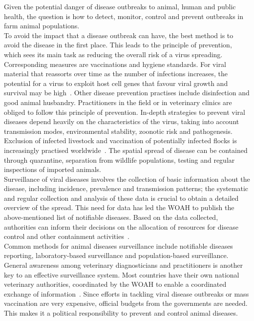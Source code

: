 Given the potential danger of disease outbreaks to animal, human and public health, the question is how to detect, monitor, control and prevent outbreaks in farm animal populations. \\
To avoid the impact that a disease outbreak can have, the best method is to avoid the disease in the first place. This leads to the principle of prevention, which sees its main task as reducing the overall risk of a virus spreading. Corresponding measures are vaccinations and hygiene standards. For viral material that reassorts over time as the number of infections increases, the potential for a virus to exploit host cell genes that favour viral growth and survival may be high~\cite{fenner2017maclachlan}. Other disease prevention practises include disinfection and good animal husbandry. Practitioners in the field or in veterinary clinics are obliged to follow this principle of prevention. In-depth strategies to prevent viral diseases depend heavily on the characteristics of the virus, taking into account transmission modes, environmental stability, zoonotic risk and pathogenesis. Exclusion of infected livestock and vaccination of potentially infected flocks is increasingly practised worldwide~\cite{fenner2017maclachlan}. The spatial spread of disease can be contained through quarantine, separation from wildlife populations, testing and regular inspections of imported animals. \\
Surveillance of viral diseases involves the collection of basic information about the disease, including incidence, prevalence and transmission patterns; the systematic and regular collection and analysis of these data is crucial to obtain a detailed overview of the spread. This need for data has led the \ac{WOAH} to publish the above-mentioned list of notifiable diseases. Based on the data collected, authorities can inform their decisions on the allocation of resources for disease control and other containment activities~\cite{fenner2017maclachlan, who2017one}. \\
Common methods for animal diseases surveillance include notifiable diseases reporting, laboratory-based surveillance and population-based surveillance. General awareness among veterinary diagnosticians and practitioners is another key to an effective surveillance system. Most countries have their own national veterinary authorities, coordinated by the \ac{WOAH} to enable a coordinated exchange of information~\cite{who2017one}. Since efforts in tackling viral disease outbreaks or mass vaccination are very expensive, official budgets from the governments are needed. This makes it a political responsibility to prevent and control animal diseases. \\
